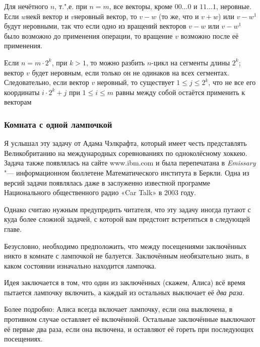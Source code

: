 \documentclass[twoside]{book}
\begin{document}
Для нечётного $n$, т.",е. при $n=m$, все векторы, кроме $00\dots0$ и $11\dots1$, неровные.
Если $w$некй вектор и $v$неровный вектор, то $v-w$ (то же, что и $v+w$) или $v-w^1$ будут неровными, так что если одно из вращений векторов $v-w$ или $v-w^1$ было возможно до применения операции, то вращение $v$ возможно после её применения.

Если $n=m\cdot 2^k$, при $k>1$, то можно разбить $n$-цикл на сегменты длины $2^k$; вектор $v$ будет неровным, если только он не одинаков на всех сегментах.
Следовательно, если вектор $v$ неровный, то существует  $1\le j\le 2^k$,  что не все его координаты $i\cdot 2^k+j$ при $1\le i\le m$ равны между собой остаётся применить  к векторам 

\subsubsection*{Комната с одной лампочкой}%

Я услышал эту задачу от Адама Чэлкрафта, %
который имеет честь представлять Великобританию на международных соревнованиях по одноколёсному хоккею.
Задача также появлялась на сайте www.ibm.com и была перепечатана в \emph{Emissary} "--- информационном бюллетене Математического института в Беркли. %
Одна из версий задачи появлялась даже в заслуженно известной программе Национального общественного радио «Car Talk» в 2003 году.

Однако считаю нужным предупредить читателя, что эту задачу иногда путают с куда более сложной задачей, с которой вам предстоит встретиться в следующей главе.


Безусловно, необходимо предположить, что между посещениями заключённых никто в комнате с лампочкой не балуется.
Заключённым необязательно знать, в каком состоянии изначально находится лампочка.

{


Идея заключается в том, что один из заключённых (скажем, Алиса) всё время пытается лампочку включить, а каждый из остальных выключает её \emph{два раза}.

}

Более подробно: Алиса всегда включает лампочку, если она выключена, в противном случае оставляет её включённой.
Остальные заключённые выключают её первые два раза, если она включена, и оставляют её гореть при последующих посещениях.
\end{document}
